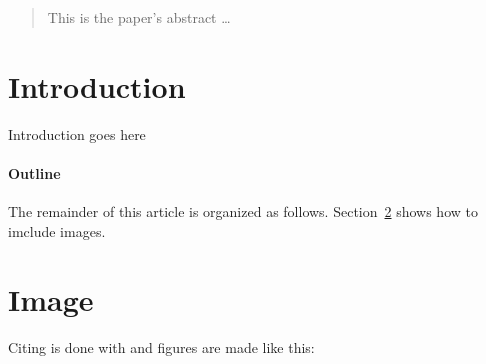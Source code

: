 \documentclass[12pt]{article}
\begin{document}
\maketitle

\begin{abstract}
This is the paper's abstract \ldots
\end{abstract}


\section{Introduction}
Introduction goes here

\paragraph{Outline}
The remainder of this article is organized as follows.
Section~\ref{image} shows how to imclude images.

\section{Image}\label{image}
Citing is done with \cite{frombib} and figures are made like this:

\begin{figure}[h]
    \centering
    \label{fig:example}
\end{figure}



\end{document}
